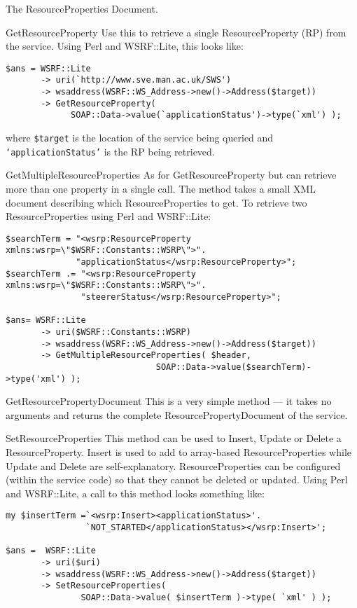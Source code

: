 \documentclass[a4paper]{article}
\begin{document}
\begin{section}{The ResourceProperties Document.}
\begin{subsection}{GetResourceProperty}
Use this to retrieve a single ResourceProperty (RP) from the service.  Using
Perl and WSRF::Lite, this looks like:
\begin{verbatim}
$ans = WSRF::Lite
       -> uri(`http://www.sve.man.ac.uk/SWS')
       -> wsaddress(WSRF::WS_Address->new()->Address($target))
       -> GetResourceProperty( 
             SOAP::Data->value(`applicationStatus')->type(`xml') );
\end{verbatim}
where \texttt{\$target} is the location of the service being queried and
\texttt{`applicationStatus'} is the RP being retrieved.
\end{subsection}

\begin{subsection}{GetMultipleResourceProperties}
As for GetResourceProperty but can retrieve more than one property in
a single call.  The method takes a small XML document describing which
ResourceProperties to get.  To retrieve two ResourceProperties using
Perl and WSRF::Lite:
\begin{verbatim}
$searchTerm = "<wsrp:ResourceProperty xmlns:wsrp=\"$WSRF::Constants::WSRP\">".
              "applicationStatus</wsrp:ResourceProperty>";
$searchTerm .= "<wsrp:ResourceProperty xmlns:wsrp=\"$WSRF::Constants::WSRP\">".
               "steererStatus</wsrp:ResourceProperty>";

$ans= WSRF::Lite
       -> uri($WSRF::Constants::WSRP)
       -> wsaddress(WSRF::WS_Address->new()->Address($target))
       -> GetMultipleResourceProperties( $header, 
                              SOAP::Data->value($searchTerm)->type('xml') );
\end{verbatim}

\end{subsection}

\begin{subsection}{GetResourcePropertyDocument}
This is a very simple method --- it takes no arguments and returns the
complete ResourcePropertyDocument of the service.
\end{subsection}

\begin{subsection}{SetResourceProperties}
This method can be used to Insert, Update or Delete a
ResourceProperty.  Insert is used to add to array-based
ResourceProperties while Update and Delete are self-explanatory.
ResourceProperties can be configured (within the service code) so that
they cannot be deleted or updated.  Using Perl and WSRF::Lite, a call
to this method looks something like:
\begin{verbatim}
my $insertTerm =`<wsrp:Insert><applicationStatus>'.
                `NOT_STARTED</applicationStatus></wsrp:Insert>';

$ans =  WSRF::Lite
       -> uri($uri)
       -> wsaddress(WSRF::WS_Address->new()->Address($target))  
       -> SetResourceProperties( 
               SOAP::Data->value( $insertTerm )->type( `xml' ) );
\end{verbatim}
\end{subsection}

\end{section}
\end{document}
